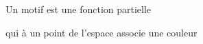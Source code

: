 \documentclass[preview]{standalone}
\begin{document}
\begin{center}
Un motif est une fonction partielle 
        
qui à un point de l'espace associe une couleur
\end{center}
\end{document}
